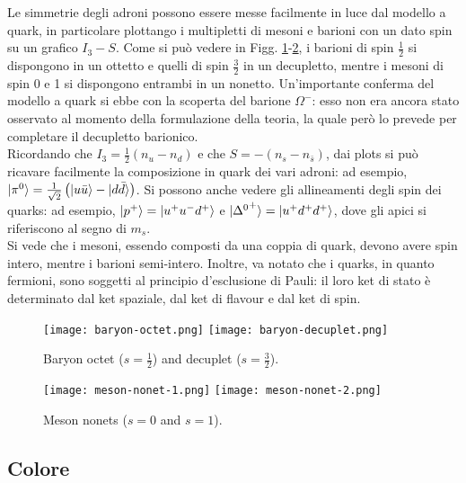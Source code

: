 Le simmetrie degli adroni possono essere messe facilmente in luce dal modello a quark, in particolare plottango i multipletti di mesoni e barioni con un dato spin su un grafico $ I_3 - S $. Come si può vedere in Figg. \ref{baryons}-\ref{mesons}, i barioni di spin $ \frac{1}{2} $ si dispongono in un ottetto e quelli di spin $ \frac{3}{2} $ in un decupletto, mentre i mesoni di spin 0 e 1 si dispongono entrambi in un nonetto. Un'importante conferma del modello a quark si ebbe con la scoperta del barione $ \Omega^- $: esso non era ancora stato osservato al momento della formulazione della teoria, la quale però lo prevede per completare il decupletto barionico.\\
Ricordando che $ I_3 = \frac{1}{2} \left( n_u - n_d \right) $ e che $ S = - \left( n_s - n_{\bar{s}} \right) $, dai plots si può ricavare facilmente la composizione in quark dei vari adroni: ad esempio, $ \ket{\pi^0} = \frac{1}{\sqrt{2}} \left( \ket{u\bar{u}} - \ket{d\bar{d}} \right) $. Si possono anche vedere gli allineamenti degli spin dei quarks: ad esempio, $ \ket{p^+} = \ket{u^+ u^- d^+} $ e $ \ket{{\Delta^0}^+} = \ket{u^+ d^+ d^+} $, dove gli apici si riferiscono al segno di $ m_s $.\\
Si vede che i mesoni, essendo composti da una coppia di quark, devono avere spin intero, mentre i barioni semi-intero. Inoltre, va notato che i quarks, in quanto fermioni, sono soggetti al principio d'esclusione di Pauli: il loro ket di stato è determinato dal ket spaziale, dal ket di flavour e dal ket di spin.

\begin{figure}
	\centering
	\texttt{[image: baryon-octet.png]}
	\texttt{[image: baryon-decuplet.png]}
	\caption{Baryon octet ($ s = \frac{1}{2} $) and decuplet ($ s = \frac{3}{2} $).}
	\label{baryons}
\end{figure}
\begin{figure}
	\centering
	\texttt{[image: meson-nonet-1.png]}
	\texttt{[image: meson-nonet-2.png]}
	\caption{Meson nonets ($ s = 0 $ and $ s = 1 $).}
	\label{mesons}
\end{figure}

\subsection{Colore}

